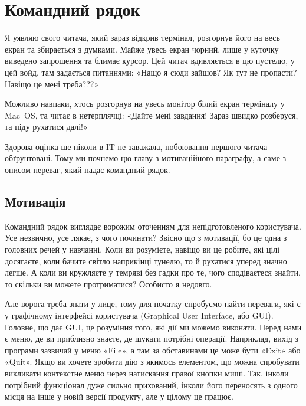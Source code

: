 \chapter{Командний рядок}

Я уявляю свого читача, який зараз відкрив термінал, розгорнув його на весь екран та збирається з думками.
Майже увесь екран чорний, лише у куточку виведено запрошення та блимає курсор.
Цей читач вдивляється в цю пустелю, у цей войд, там задається питаннями:
«Нащо я сюди зайшов?
Як тут не пропасти?
Навіщо це мені треба???»

Можливо навпаки, хтось розгорнув на увесь монітор білий екран терміналу у Mac~OS, та читає в нетерплячці:
«Дайте мені завдання!
Зараз швидко розберуся, та піду рухатися далі!»

Здорова оцінка ще ніколи в IT не заважала, побоювання першого читача обґрунтовані.
Тому ми почнемо цю главу з мотиваційного параграфу, а саме з описом переваг, який надає командний рядок.

\vfill
\pagebreak

\section{Мотивація}

Командний рядок виглядає ворожим оточенням для непідготовленого користувача.
Усе незвично, усе лякає, з чого починати?
Звісно що з мотивації, бо це одна з головних речей у навчанні.
Коли ви розумієте, навіщо ви це робите, які цілі досягаєте, коли бачите світло наприкінці тунелю, то й рухатися уперед значно легше.
А коли ви кружляєте у темряві без гадки про те, чого сподіваєтеся знайти, то скільки ви можете протриматися?
Особисто я недовго.

Але ворога треба знати у лице, тому для початку спробуємо найти переваги, які є у графічному інтерфейсі користувача (Graphical User Interface, або GUI).
Головне, що дає GUI, це розуміння того, які дії ми можемо виконати.
Перед нами є меню, де ви приблизно знаєте, де шукати потрібні операції.
Наприклад, вихід з програми зазвичай у меню «File», а там за обставинами це може бути «Exit» або «Quit».
Якщо ви хочете зробити дію з якимось елементом, що можна спробувати викликати контекстне меню через натискання правої кнопки миші.
Так, інколи потрібний функціонал дуже сильно прихований, інколи його переносять з одного місця на інше у новій версії продукту, але у цілому це працює.

